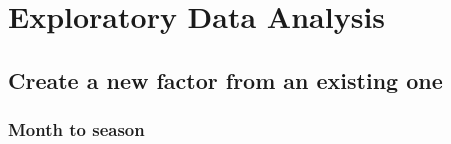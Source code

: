\documentclass[]{article}
\newenvironment{Shaded}{\begin{snugshade}}{\end{snugshade}}
\newcommand{\KeywordTok}[1]{\textcolor[rgb]{0.13,0.29,0.53}{\textbf{#1}}}
\newcommand{\DataTypeTok}[1]{\textcolor[rgb]{0.13,0.29,0.53}{#1}}
\newcommand{\StringTok}[1]{\textcolor[rgb]{0.31,0.60,0.02}{#1}}
\newcommand{\CommentTok}[1]{\textcolor[rgb]{0.56,0.35,0.01}{\textit{#1}}}
\newcommand{\OperatorTok}[1]{\textcolor[rgb]{0.81,0.36,0.00}{\textbf{#1}}}
\newcommand{\NormalTok}[1]{#1}
\begin{document}
\section{Exploratory Data Analysis}\label{exploratory-data-analysis}

\subsection{Create a new factor from an existing
one}\label{create-a-new-factor-from-an-existing-one}

\subsubsection{Month to season}\label{month-to-season}

\begin{Shaded}
\end{Shaded}
\end{document}
